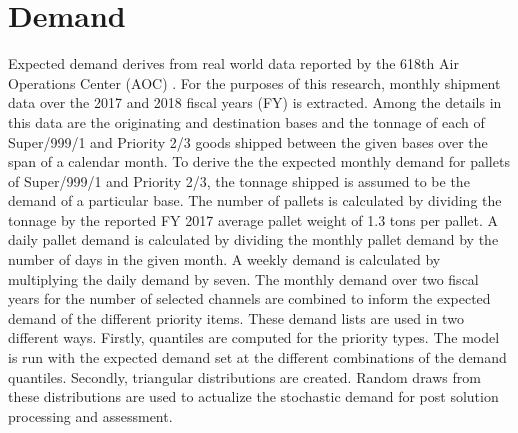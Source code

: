 \section{Demand}
Expected demand derives from real world data reported by the 618th Air Operations Center (AOC) \cite{Cargo2017}\cite{Cargo2018}. For the purposes of this research, monthly shipment data over the 2017 and 2018 fiscal years (FY) is extracted.  Among the details in this data are the originating and destination bases and the tonnage of each of Super/999/1 and Priority 2/3 goods shipped between the given bases over the span of a calendar month. To derive the the expected monthly demand for pallets of Super/999/1 and Priority 2/3, the tonnage shipped is assumed to be the demand of a particular base.  The number of pallets is calculated by dividing the tonnage by the reported FY 2017 average pallet weight of 1.3 tons per pallet. A daily pallet demand is calculated by dividing the monthly pallet demand by the number of days in the given month. A weekly demand is calculated by multiplying the daily demand by seven.  The monthly demand over two fiscal years for the number of selected channels are combined to inform the expected demand of the different priority items. These demand lists are used in two different ways. Firstly, quantiles are computed for the priority types.  The model is run with the expected demand set at the different combinations of the demand quantiles. Secondly, triangular distributions are created. Random draws from these distributions are used to actualize the stochastic demand for post solution processing and assessment.   

